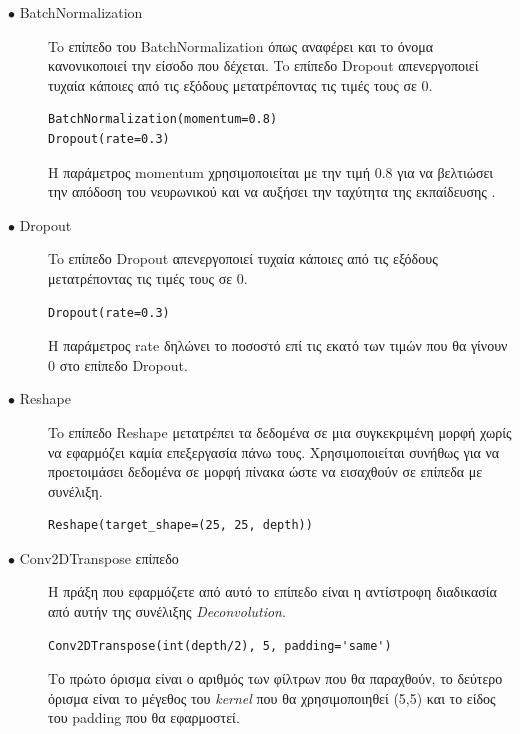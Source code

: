 \begin{description}
\item[$\bullet$ BatchNormalization] To επίπεδο του BatchNormalization όπως αναφέρει και το όνομα κανονικοποιεί την είσοδο που δέχεται. To επίπεδο Dropout απενεργοποιεί τυχαία κάποιες από τις εξόδους μετατρέποντας τις τιμές τους σε 0. \cite{batch}
\par
\begin{verbatim}
BatchNormalization(momentum=0.8)
Dropout(rate=0.3)
\end{verbatim}
\par
Η παράμετρος momentum χρησιμοποιείται με την τιμή 0.8 για να βελτιώσει την απόδοση του νευρωνικού και να αυξήσει την ταχύτητα της εκπαίδευσης \cite{firstgan}.
\end{description}

\begin{description}
\item[$\bullet$ Dropout] To επίπεδο Dropout απενεργοποιεί τυχαία κάποιες από τις εξόδους μετατρέποντας τις τιμές τους σε 0. \cite{dropout}
\par
\begin{verbatim}
Dropout(rate=0.3)
\end{verbatim}
\par
H παράμετρος rate δηλώνει το ποσοστό επί τις εκατό των τιμών που θα γίνουν 0 στο επίπεδο Dropout.
\end{description}

\begin{description}
\item[$\bullet$ Reshape] To επίπεδο Reshape μετατρέπει τα δεδομένα σε μια συγκεκριμένη μορφή χωρίς να εφαρμόζει καμία επεξεργασία πάνω τους. Χρησιμοποιείται συνήθως για να προετοιμάσει δεδομένα σε μορφή πίνακα ώστε να εισαχθούν σε επίπεδα με συνέλιξη. \cite{reshape}
\par
\begin{verbatim}
Reshape(target_shape=(25, 25, depth))
\end{verbatim}
\end{description}

\begin{description}
\item[$\bullet$ Conv2DTranspose επίπεδο] H πράξη που εφαρμόζετε από αυτό το επίπεδο είναι η αντίστροφη διαδικασία από αυτήν της συνέλιξης \textit{Deconvolution}. \cite{conv2dtranspose}
\begin{verbatim}
Conv2DTranspose(int(depth/2), 5, padding='same')
\end{verbatim}
\par
Το πρώτο όρισμα είναι ο αριθμός των φίλτρων που θα παραχθούν, το δεύτερο όρισμα είναι το μέγεθος του \textit{kernel} που θα χρησιμοποιηθεί (5,5) και το είδος του padding που θα εφαρμοστεί.
\end{description}


